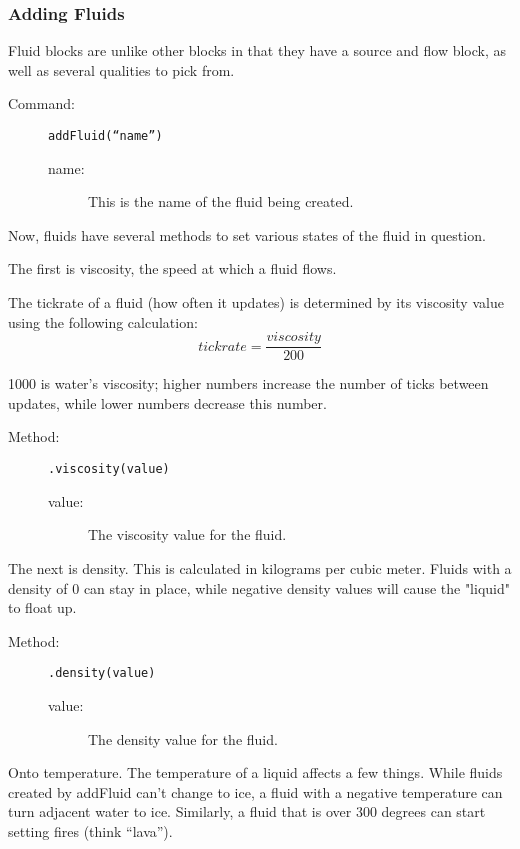\documentclass[letterpaper,titlepage,12pt]{article}
\begin{document}
\subsubsection{Adding Fluids}

Fluid blocks are unlike other blocks in that they have a source and flow block, as well as several qualities to pick from.

\begin{description}
\item[Command:] \texttt{addFluid(``name'')}
\begin{description}
\item [name:] This is the name of the fluid being created.
\end{description}
\end{description}

Now, fluids have several methods to set various states of the fluid in question.  

The first is viscosity, the speed at which a fluid flows.  

The tickrate of a fluid (how often it updates) is determined by its viscosity value using the following calculation: $$tickrate = \frac{viscosity}{200}$$

1000 is water's viscosity; higher numbers increase the number of ticks between updates, while lower numbers decrease this number.

\begin{description}
\item[Method:] \texttt{.viscosity(value)}
\begin{description}
\item [value:] The viscosity value for the fluid.
\end{description}
\end{description}

The next is density.  This is calculated in kilograms per cubic meter.  Fluids with a density of 0 can stay in place, while negative density values will cause the "liquid" to float up.

\begin{description}
\item[Method:] \texttt{.density(value)}
\begin{description}
\item [value:] The density value for the fluid.
\end{description}
\end{description}

Onto temperature.  The temperature of a liquid affects a few things.  While fluids created by addFluid can't change to ice, a fluid with a negative temperature can turn adjacent water to ice.  Similarly, a fluid that is over 300 degrees can start setting fires (think ``lava'').
\end{document}
